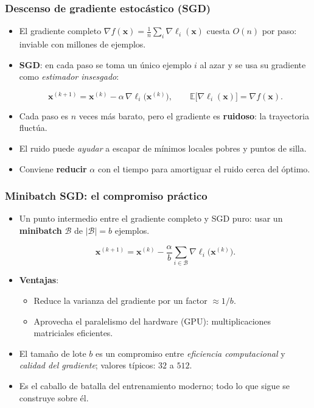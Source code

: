 \documentclass[aspectratio=169, 10pt]{beamer}
\newcommand{\E}{\mathbb{E}}
\newcommand{\xv}{\bm{x}}
\newcommand{\grad}{\nabla}
\newcommand{\formula}[1]{%
	\begin{tcolorbox}[colback=UCMBlue!8, colframe=UCMBlue, arc=4pt,
		boxsep=2pt, left=6pt, right=6pt, top=3pt, bottom=3pt]
		#1
	\end{tcolorbox}
}
\begin{document}
\begin{frame}
\frametitle{Descenso de gradiente estoc\'astico (SGD)}
\begin{itemize}
	\item El gradiente completo $\grad f(\xv)=\frac{1}{n}\sum_i \grad \ell_i(\xv)$ cuesta $O(n)$ por paso: inviable con millones de ejemplos.
	\pause
	\item \textbf{SGD}: en cada paso se toma un \'unico ejemplo $i$ al azar y se usa su gradiente como \emph{estimador insesgado}:
	\formula{\[ \xv^{(k+1)} = \xv^{(k)} - \alpha\,\grad \ell_i\big(\xv^{(k)}\big), \qquad \E\big[\grad \ell_i(\xv)\big] = \grad f(\xv). \]}
	\pause
	\item Cada paso es $n$ veces m\'as barato, pero el gradiente es \textbf{ruidoso}: la trayectoria fluct\'ua.
	\pause
	\item El ruido puede \emph{ayudar} a escapar de m\'inimos locales pobres y puntos de silla.
	\item Conviene \textbf{reducir} $\alpha$ con el tiempo para amortiguar el ruido cerca del \'optimo.
\end{itemize}
\end{frame}

\begin{frame}
\frametitle{Minibatch SGD: el compromiso pr\'actico}
\begin{itemize}
	\item Un punto intermedio entre el gradiente completo y SGD puro: usar un \textbf{minibatch} $\mathcal{B}$ de $|\mathcal{B}|=b$ ejemplos.
	\formula{\[ \xv^{(k+1)} = \xv^{(k)} - \frac{\alpha}{b}\sum_{i\in\mathcal{B}} \grad \ell_i\big(\xv^{(k)}\big). \]}
	\pause
	\item \textbf{Ventajas}:
	\begin{itemize}
		\item Reduce la varianza del gradiente por un factor $\approx 1/b$.
		\item Aprovecha el paralelismo del hardware (GPU): multiplicaciones matriciales eficientes.
	\end{itemize}
	\pause
	\item El tama\~no de lote $b$ es un compromiso entre \emph{eficiencia computacional} y \emph{calidad del gradiente}; valores t\'ipicos: $32$ a $512$.
	\item Es el caballo de batalla del entrenamiento moderno; todo lo que sigue se construye sobre \'el.
\end{itemize}
\end{frame}
\end{document}
